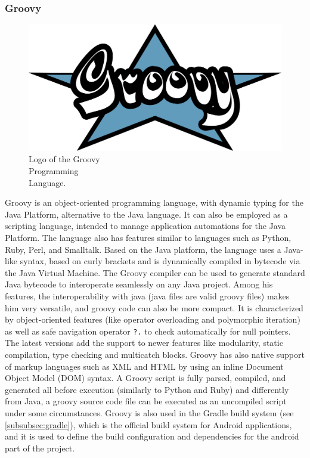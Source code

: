 \subsubsection{Groovy}

\begin{figure} %
    \captionsetup{font=footnotesize}
    \centering
    \includegraphics[width=\linewidth]{images/groovy.png}
    \caption{Logo of the Groovy\\Programming\\Language.}
\end{figure}

Groovy is an object-oriented programming language, with dynamic typing for the Java Platform, alternative to the Java language. It can also be employed as a scripting language, intended to manage application automations for the Java Platform. The language also has features similar to languages such as Python, Ruby, Perl, and Smalltalk. Based on the Java platform, the language uses a Java-like syntax, based on curly brackets and is dynamically compiled in bytecode via the Java Virtual Machine. The Groovy compiler can be used to generate standard Java bytecode to interoperate seamlessly on any Java project. Among his features, the interoperability with java (java files are valid groovy files) makes him very versatile, and groovy code can also be more compact. It is characterized by object-oriented features (like operator overloading and polymorphic iteration) as well as safe navigation operator \texttt{?.} to check automatically for null pointers. The latest versions add the support to newer features like modularity, static compilation, type checking and multicatch blocks. Groovy has also native support of markup languages such as XML and HTML by using an inline Document Object Model (DOM) syntax. A Groovy script is fully parsed, compiled, and generated all before execution (similarly to Python and Ruby) and differently from Java, a groovy source code file can be executed as an uncompiled script under some circumstances\cite{Groovy}. Groovy is also used in the Gradle build system (see \cref{subsubsec:gradle}), which is the official build system for Android applications, and it is used to define the build configuration and dependencies for the android part of the project.  

